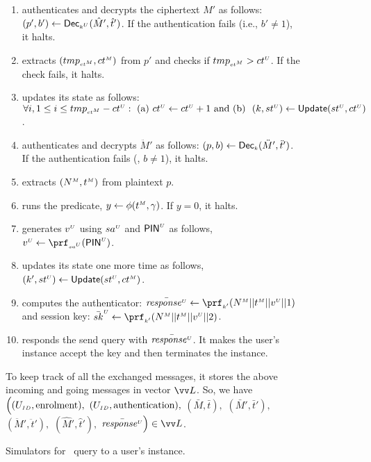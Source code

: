 \begin{figure}[H]
\begin{center}
\begin{tcolorbox}[enhanced,width=4.7in,left=0.1cm, 
    drop fuzzy shadow southwest,
    colframe=black,colback=white]
{{\begin{itemize}[leftmargin=.4cm]
\begin{itemize}[leftmargin=.4cm]
\begin{enumerate}
 \item   authenticates and decrypts the ciphertext $\hat M'$ as follows: $(p', b') \gets \mathsf{Dec}_{\scriptscriptstyle k^{\scriptscriptstyle U}}(\hat M', \hat t')$. If the authentication fails (i.e., $b'\neq 1$), it halts.  
  \item extracts $({tmp}_{\scriptscriptstyle{ct}^{\scriptscriptstyle M}}, {ct}^{\scriptscriptstyle M})$ from $p'$ and checks if ${tmp}_{\scriptscriptstyle{ct}^{\scriptscriptstyle M}} > {ct}^{\scriptscriptstyle U} $. If the check fails, it halts. 
 \item updates its state as follows: $\forall i, 1\leq i\leq {tmp}_{\scriptscriptstyle{ct}^{\scriptscriptstyle M}}- {ct}^{\scriptscriptstyle U}: \text{\ (a)\ } {ct}^{\scriptscriptstyle U} \gets {ct}^{\scriptscriptstyle U} + 1\text{\ and (b) \ } (k,  {st}^{\scriptscriptstyle U}) \gets \mathsf{Update}({st}^{\scriptscriptstyle U}, {ct}^{\scriptscriptstyle U})$. 
 \item  authenticates and decrypts $\ddot M'$ as follows: $(p, b) \gets \mathsf{Dec}_{\scriptscriptstyle k}(\ddot M', \ddot t')$. If the authentication fails (\ie, $b\neq 1$), it halts.
 \item    extracts $({N}^{\scriptscriptstyle M}, {t}^{\scriptscriptstyle M})$ from plaintext $p$.  
 \item runs the predicate, $y \leftarrow\phi({t}^{\scriptscriptstyle M}, \gamma)$. If $y=0$, it halts. 
\item generates ${v}^{\scriptscriptstyle U}$ using ${sa}^{\scriptscriptstyle U}$ and $\mathsf{PIN}^{\scriptscriptstyle U}$ as follows, $\VC{\verifier} \gets \prf_{\sss\VC{\salt}}(\VC{\pin})$.
 \item updates its state one more time as follows, $(k',  {st}^{\scriptscriptstyle U}) \gets \mathsf{Update}({st}^{\scriptscriptstyle U}, {ct}^{\scriptscriptstyle M})$.
 \item computes  the authenticator: $\bar{\VC{\mathit{response}}} \gets \prf_{\sss k'}( \VM{\nonce} || \VM{\trans} || \VC{\verifier}|| 1)$ and session key:  $\bar {sk}^{\sss U} \gets \prf_{\sss k'}( \VM{\nonce} || \VM{\trans} || \VC{\verifier}|| 2)$.
 \item responds the send query with  $\bar{\mathit{response}^{\scriptscriptstyle U}}$. It makes the user's instance accept the key and then terminates the instance. 
 \end{enumerate}
 \end{itemize}
 \end{itemize}
}}
To keep track of all the exchanged messages, it stores the above incoming and going messages in vector $\vv L$. So, we have $\Big((U_{\scriptscriptstyle ID},  \text{enrolment}),$ $ (U_{\scriptscriptstyle ID},  \text{authentication}), $ $(\bar M, \bar t), $ $(\bar M', \bar t'),$ $(\ddot M', \ddot t'), $ $(\hat M', \hat t'), $ $\bar{\VC{\mathit{response}}}\Big)\in \vv L$.
\end{tcolorbox}
\end{center}
\vspace{-5mm}
\caption{Simulators for \send\ query to  a user's instance.} 
\label{fig::Send-sim-to-client}
\end{figure}



